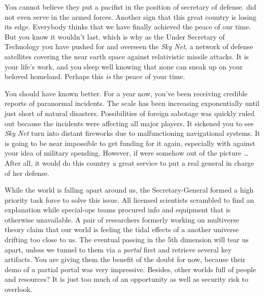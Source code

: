 \documentclass[char]{guildcamp3}
\begin{document}
\name{\cPoliTwo{}}




You cannot believe they put a pacifist in the position of secretary of defense. \cPoliOne{\intro} did not even serve in the armed forces. Another sign that this great country is losing its edge. Everybody thinks that we have finally achieved the peace of our time. But you know it wouldn't last, which is why as the Under Secretary of Technology you have pushed for and overseen the \emph{Sky Net}, a network of defense satellites covering the near earth space against relativistic missile attacks. It is your life's work, and you sleep well knowing that none can sneak up on your beloved homeland. Perhaps this \emph{is} the peace of your time. 

You should have known better. For a year now, you've been receiving credible reports of paranormal incidents. The scale has been increasing exponentially until just short of natural disasters. Possibilities of foreign sabotage was quickly ruled out because the incidents were affecting all major players. It sickened you to see \emph{Sky Net} turn into distant fireworks due to malfunctioning navigational systems. It is going to be near impossible to get funding for it again, especially with \cPoliOne{} against your idea of military spending. However, if \cPoliOne{} were somehow out of the picture \ldots  After all, it would do this country a great service to put a real general in charge of her defense.

While the world is falling apart around us, the Secretary-General formed a high priority task force to solve this issue. All licensed scientists scrambled to find an explanation while special-ops teams procured info and equipment that is otherwise unavailable. A pair of researchers formerly working on multiverse theory claim that our world is feeling the tidal effects of a another universe drifting too close to us. The eventual passing in the 5th dimension will tear us apart, unless we tunnel to them via a \emph{portal} first and retrieve several key artifacts. You are giving them the benefit of the doubt for now, because their demo of a partial portal was very impressive. Besides, other worlds full of people and resources? It is just too much of an opportunity as well as security risk to overlook. 
\end{document}
